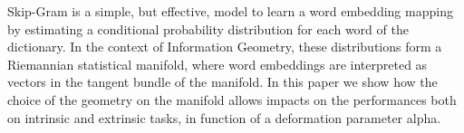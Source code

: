 Skip-Gram is a simple, but effective, model to learn a word embedding mapping by estimating a conditional probability distribution for each word of the dictionary. In the context of Information Geometry, these distributions form a Riemannian statistical manifold, where word embeddings are interpreted as vectors in the tangent bundle of the manifold. In this paper we show how the choice of the geometry on the manifold allows impacts on the performances both on intrinsic and extrinsic tasks, in function of a deformation parameter alpha.
